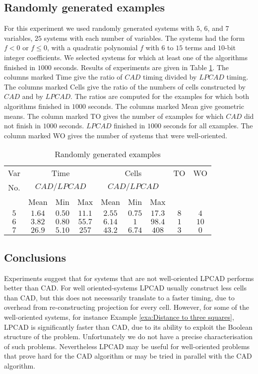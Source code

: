 \documentclass[english]{amsart}
\providecommand{\tabularnewline}{\\}
\numberwithin{equation}{section}
\numberwithin{figure}{section}
\begin{document}
\subsection{Randomly generated examples}

For this experiment we used randomly generated systems with $5$,
$6$, and $7$ variables, $25$ systems with each number of variables.
The systems had the form $f<0$ or $f\leq0$, with a quadratic polynomial
$f$ with $6$ to $15$ terms and $10$-bit integer coefficients.
We selected systems for which at least one of the algorithms finished
in $1000$ seconds. Results of experiments are given in Table \ref{tab:Random}.
The columns marked Time give the ratio of $CAD$ timing divided by
$LPCAD$ timing. The columns marked Cells give the ratio of the numbers
of cells constructed by $CAD$ and by $LPCAD$. The ratios are computed
for the examples for which both algorithms finished in $1000$ seconds.
The columns marked Mean give geometric means. The column marked TO
gives the number of examples for which $CAD$ did not finish in $1000$
seconds. $LPCAD$ finished in $1000$ seconds for all examples. The
column marked WO gives the number of systems that were well-oriented.

\begin{table}
\caption{\label{tab:Random}Randomly generated examples}
\begin{tabular}{|c|c|c|c|c|c|c|c|c|}
\hline 
Var & \multicolumn{3}{c|}{Time} & \multicolumn{3}{c|}{Cells} & \multicolumn{1}{c|}{TO} & WO\tabularnewline
No. & \multicolumn{3}{c|}{$CAD/LPCAD$} & \multicolumn{3}{c|}{$CAD/LPCAD$} &  & \tabularnewline
\cline{2-7} 
 & Mean & \multicolumn{1}{c|}{Min} & \multicolumn{1}{c|}{Max} & Mean & Min & Max &  & \tabularnewline
\hline 
$5$ & $1.64$ & $0.50$ & $11.1$ & $2.55$ & $0.75$ & $17.3$ & $8$ & $4$\tabularnewline
\hline 
$6$ & $3.82$ & $0.80$ & $55.7$ & $6.14$ & $1$ & $98.4$ & $1$ & $10$\tabularnewline
\hline 
$7$ & $26.9$ & $5.10$ & $257$ & $43.2$ & $6.74$ & $408$ & $3$ & $0$\tabularnewline
\hline
\end{tabular} 
\end{table}



\subsection{Conclusions}

Experiments suggest that for systems that are not well-oriented LPCAD
performs better than CAD. For well oriented-systems LPCAD usually
construct less cells than CAD, but this does not necessarily translate
to a faster timing, due to overhead from re-constructing projection
for every cell. However, for some of the well-oriented systems, for
instance Example \ref{exa:Distance to three squares}, LPCAD is significantly
faster than CAD, due to its ability to exploit the Boolean structure
of the problem. Unfortunately we do not have a precise characterisation
of such problems. Nevertheless LPCAD may be useful for well-oriented
problems that prove hard for the CAD algorithm or may be tried in
parallel with the CAD algorithm.
\end{document}
